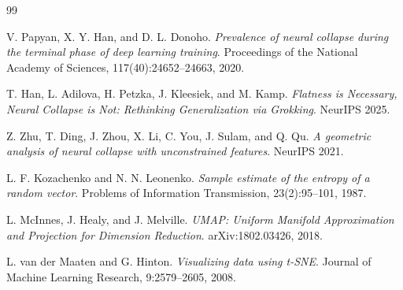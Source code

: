 \documentclass[12pt,a4paper]{report}
\begin{document}
\begin{thebibliography}{99}

V. Papyan, X. Y. Han, and D. L. Donoho.
\emph{Prevalence of neural collapse during the terminal phase of deep learning training}.
Proceedings of the National Academy of Sciences, 117(40):24652--24663, 2020.

T. Han, L. Adilova, H. Petzka, J. Kleesiek, and M. Kamp.
\emph{Flatness is Necessary, Neural Collapse is Not: Rethinking Generalization via Grokking}.
NeurIPS 2025.

Z. Zhu, T. Ding, J. Zhou, X. Li, C. You, J. Sulam, and Q. Qu.
\emph{A geometric analysis of neural collapse with unconstrained features}.
NeurIPS 2021.

L. F. Kozachenko and N. N. Leonenko.
\emph{Sample estimate of the entropy of a random vector}.
Problems of Information Transmission, 23(2):95--101, 1987.

L. McInnes, J. Healy, and J. Melville.
\emph{UMAP: Uniform Manifold Approximation and Projection for Dimension Reduction}.
arXiv:1802.03426, 2018.

L. van der Maaten and G. Hinton.
\emph{Visualizing data using t-SNE}.
Journal of Machine Learning Research, 9:2579--2605, 2008.

\end{thebibliography}
\end{document}
